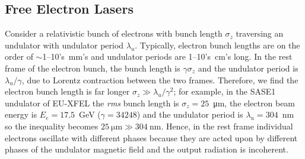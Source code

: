 \documentclass[../main.tex]{subfiles}
\begin{document}
\subsection{Free Electron Lasers}

Consider a relativistic bunch of electrons with bunch length $\sigma_{z}$ traversing an undulator with undulator period $\lambda_{u}$. Typically, electron bunch lengths are on the order of $\sim$1--10's~\si{\milli\meter}'s and undulator periods are 1--10's~\si{\centi\meter}'s long. In the rest frame of the electron bunch, the bunch length is $\gamma\sigma_{z}$ and the undulator period is $\lambda_{u}/\gamma$, due to Lorentz contraction between the two frames. Therefore, we find the electron bunch length is far longer $\sigma_{z}\gg \lambda_{u}/\gamma^{2}$; for example, in the SASE1 undulator of EU-XFEL the \textit{rms} bunch length is $\sigma_{z} = 25$~\si{\micro\meter}, the electron beam energy is $E_{e} = 17.5$~\si{\giga\electronvolt} ($\gamma = 34248$) and the undulator period is $\lambda_{u} = 304$~\si{\nano\meter} so the inequality becomes $25~\si{\micro\meter} \gg 304~\si{\nano\meter}$. Hence, in the rest frame individual electrons oscillate with different phases because they are acted upon by different phases of the undulator magnetic field and the output radiation is incoherent.
\end{document}
